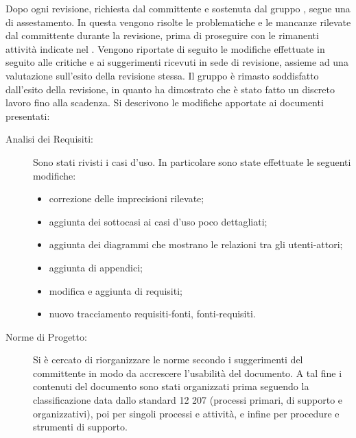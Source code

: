 Dopo ogni revisione, richiesta dal committente e sostenuta dal gruppo \groupname{}, segue una  di assestamento. In questa  vengono risolte le problematiche e le mancanze rilevate dal committente durante la revisione, prima di proseguire con le rimanenti attività indicate nel .
Vengono riportate di seguito le modifiche effettuate in seguito alle critiche e ai suggerimenti ricevuti in sede di revisione, assieme ad una valutazione sull'esito della revisione stessa.
Il gruppo è rimasto soddisfatto dall'esito della revisione, in quanto ha dimostrato che è stato fatto un discreto lavoro fino alla scadenza.
Si descrivono le modifiche apportate ai documenti presentati:
\begin{description}
\item[Analisi dei Requisiti:] Sono stati rivisti i casi d'uso. In particolare sono state effettuate le seguenti modifiche:
\begin{itemize}
\item correzione delle imprecisioni rilevate;
\item aggiunta dei sottocasi ai casi d'uso poco dettagliati;
\item aggiunta dei diagrammi che mostrano le relazioni tra gli utenti-attori;
\item aggiunta di appendici;
\item modifica e aggiunta di requisiti;
\item nuovo tracciamento requisiti-fonti, fonti-requisiti.
\end{itemize}
\item[Norme di Progetto:] Si è cercato di riorganizzare le norme secondo i suggerimenti del committente in modo da accrescere l'usabilità del documento. A tal fine i contenuti del documento sono stati organizzati prima seguendo la classificazione data dallo standard 12 207 (processi primari, di supporto e organizzativi), poi per singoli processi e attività, e infine per procedure e strumenti di supporto.

\end{description}

